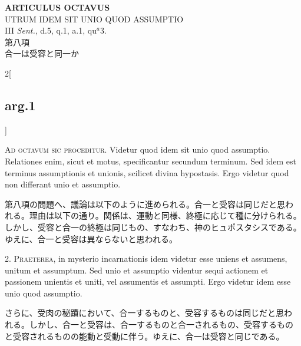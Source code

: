 \documentclass[paper=a4paper,fontsize=10pt,jafontsize=9pt,titlepage]{jlreq}
\begin{document}
{}
\setcounter{section}{8}
\setcounter{subsection}{0}
\begin{center}
{\Large {\bfseries ARTICULUS OCTAVUS}}\\ {\large UTRUM IDEM SIT UNIO QUOD
ASSUMPTIO}\\ {\footnotesize III {\itshape Sent.}, d.5, q.1, a.1,
qu$^a$3.}\\ {\Large 第八項\\合一は受容と同一か}
\end{center}

\begin{paracol}{2}[\subsection{arg.1}]

{\Huge A}{\scshape d octavum sic proceditur}. Videtur quod idem sit
unio quod assumptio. Relationes enim, sicut et motus, specificantur
secundum terminum. Sed idem est terminus assumptionis et unionis,
scilicet divina hypostasis. Ergo videtur quod non differant unio et
assumptio.

\switchcolumn

第八項の問題へ、議論は以下のように進められる。合一と受容は同じだと思わ
れる。理由は以下の通り。関係は、運動と同様、終極に応じて種に分けられる。
しかし、受容と合一の終極は同じもの、すなわち、神のヒュポスタシスである。
ゆえに、合一と受容は異ならないと思われる。


2. {\scshape Praeterea}, in mysterio incarnationis idem videtur esse
uniens et assumens, unitum et assumptum. Sed unio et assumptio
videntur sequi actionem et passionem unientis et uniti, vel assumentis
et assumpti. Ergo videtur idem esse unio quod assumptio.

\switchcolumn

さらに、受肉の秘蹟において、合一するものと、受容するものは同じだと思わ
れる。しかし、合一と受容は、合一するものと合一されるもの、受容するもの
と受容されるものの能動と受動に伴う。ゆえに、合一は受容と同じである。



\end{paracol}
\end{document}

